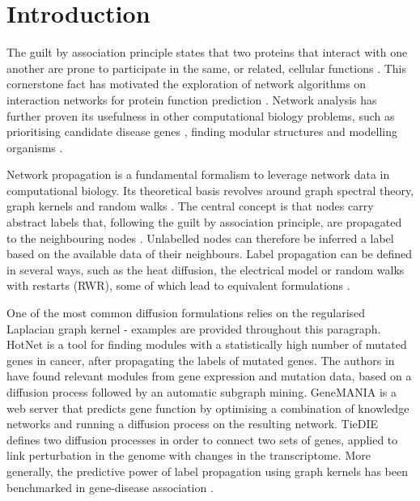 \documentclass[final]{bioinfo}
\begin{document}
\section{Introduction}

The guilt by association principle states that two proteins that interact with one another are prone to participate in the same, or related, cellular functions \citep{gba}. 
This cornerstone fact has motivated the exploration of network algorithms on interaction networks for protein function prediction \citep{sharan2007network}. 
Network analysis has further proven its usefulness in other computational biology problems, such as prioritising candidate disease genes \citep{barabasi2011network}, finding modular structures \citep{diffusionmodules} and modelling organisms \citep{aderem2005systems}.

Network propagation is a fundamental formalism to leverage network data in computational biology. 
Its theoretical basis revolves around graph spectral theory, graph kernels and random walks \citep{smola}.  
The central concept is that nodes carry abstract labels that, following the guilt by association principle, are propagated to the neighbouring nodes \citep{labelpropagation}. 
Unlabelled nodes can therefore be inferred a label based on the available data of their neighbours.
Label propagation can be defined in several ways, such as the heat diffusion, the electrical model or random walks with restarts (RWR), some of which lead to equivalent formulations \citep{cowen2017network}. 

One of the most common diffusion formulations relies on the regularised Laplacian graph kernel \citep{smola} - examples are provided throughout this paragraph.
HotNet \citep{hotnet} is a tool for finding modules with a statistically high number of mutated genes in cancer, after propagating the labels of mutated genes.
The authors in \citep{mosca} have found relevant modules from gene expression and mutation data, based on a diffusion process followed by an automatic subgraph mining.
GeneMANIA \citep{genemania} is a web server that predicts gene function by optimising a combination of knowledge networks and running a diffusion process on the resulting network. 
TieDIE \citep{tiedie} defines two diffusion processes in order to connect two sets of genes, applied to link perturbation in the genome with changes in the transcriptome.
More generally, the predictive power of label propagation using graph kernels has been benchmarked in gene-disease association \citep{valentini, diffusion_gwas, diffusionbenchmark}.
\end{document}
